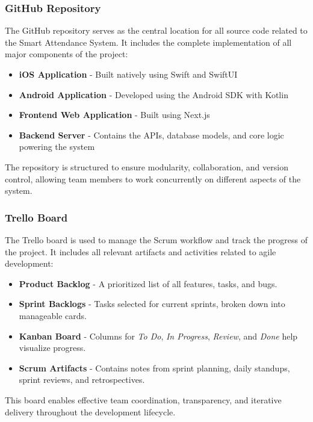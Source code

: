 \documentclass[a4paper, 12pt]{article}
\begin{document}
        \begin{minipage}[t]{0.45\textwidth}
        \subsubsection{GitHub Repository}

          The GitHub repository serves as the central location for all source code related to the Smart Attendance System. 
          It includes the complete implementation of all major components of the project:

          \begin{itemize}
            \item \textbf{iOS Application} - Built natively using Swift and SwiftUI
            \item \textbf{Android Application} - Developed using the Android SDK with Kotlin
            \item \textbf{Frontend Web Application} - Built using Next.js
            \item \textbf{Backend Server} - Contains the APIs, database models, and core logic powering the system
          \end{itemize}

          The repository is structured to ensure modularity, collaboration, and version control, allowing team members to work concurrently on different aspects of the system.
        \end{minipage}
        \hfill
        \begin{minipage}[t]{0.45\textwidth}
        \subsubsection{Trello Board}

          The Trello board is used to manage the Scrum workflow and track the progress of the project. It includes all relevant artifacts and activities related to agile development:

          \begin{itemize}
            \item \textbf{Product Backlog} - A prioritized list of all features, tasks, and bugs.
            \item \textbf{Sprint Backlogs} - Tasks selected for current sprints, broken down into manageable cards.
            \item \textbf{Kanban Board} - Columns for \emph{To Do}, \emph{In Progress}, \emph{Review}, and \emph{Done} help visualize progress.
            \item \textbf{Scrum Artifacts} - Contains notes from sprint planning, daily standups, sprint reviews, and retrospectives.
          \end{itemize}

          This board enables effective team coordination, transparency, and iterative delivery throughout the development lifecycle.
        \end{minipage}
        \newpage
  
\end{document}
